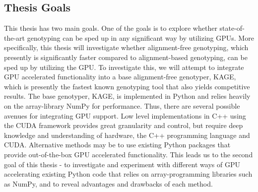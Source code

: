 \subsection{Thesis Goals} \label{introduction:thesis_goals}
This thesis has two main goals.
One of the goals is to explore whether state-of-the-art genotyping can be sped up in any significant way by utilizing GPUs.
More specifically, this thesis will investigate whether alignment-free genotyping, which presently is significantly faster compared to alignment-based genotyping, can be sped up by utilizing the GPU.
To investigate this, we will attempt to integrate GPU accelerated functionality into a base alignment-free genotyper, KAGE, which is presently the fastest known genotyping tool that also yields competitive results.
The base genotyper, KAGE, is implemented in Python and relies heavily on the array-library NumPy for performance.
Thus, there are several possible avenues for integrating GPU support. 
Low level implementations in C++ using the CUDA framework provides great granularity and control, but require deep knowledge and understanding of hardware, the C++ programming language and CUDA.
Alternative methods may be to use existing Python packages that provide out-of-the-box GPU accelerated functionality.
This leads us to the second goal of this thesis - to investigate and experiment with different ways of GPU accelerating existing Python code that relies on array-programming libraries such as NumPy, and to reveal advantages and drawbacks of each method.
